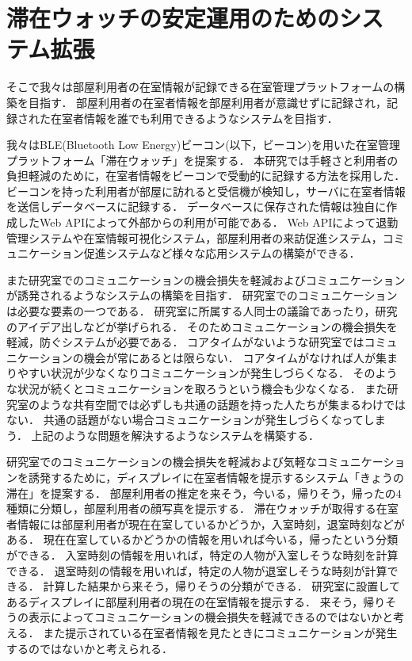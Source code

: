 \section{滞在ウォッチの安定運用のためのシステム拡張}\label{1.2}
そこで我々は部屋利用者の在室情報が記録できる在室管理プラットフォームの構築を目指す．
部屋利用者の在室者情報を部屋利用者が意識せずに記録され，記録された在室者情報を誰でも利用できるようなシステムを目指す．

我々はBLE(Bluetooth Low Energy)ビーコン(以下，ビーコン)\cite{beacon}を用いた在室管理プラットフォーム「滞在ウォッチ」を提案する．
本研究では手軽さと利用者の負担軽減のために，在室者情報をビーコンで受動的に記録する方法を採用した．%
ビーコンを持った利用者が部屋に訪れると受信機が検知し，サーバに在室者情報を送信しデータベースに記録する．
データベースに保存された情報は独自に作成したWeb APIによって外部からの利用が可能である．
Web APIによって退勤管理システムや在室情報可視化システム，部屋利用者の来訪促進システム，コミュニケーション促進システムなど様々な応用システムの構築ができる．

また研究室でのコミュニケーションの機会損失を軽減およびコミュニケーションが誘発されるようなシステムの構築を目指す．
研究室でのコミュニケーションは必要な要素の一つである．
研究室に所属する人同士の議論であったり，研究のアイデア出しなどが挙げられる．
そのためコミュニケーションの機会損失を軽減，防ぐシステムが必要である．
コアタイムがないような研究室ではコミュニケーションの機会が常にあるとは限らない．
コアタイムがなければ人が集まりやすい状況が少なくなりコミュニケーションが発生しづらくなる．
そのような状況が続くとコミュニケーションを取ろうという機会も少なくなる．
また研究室のような共有空間では必ずしも共通の話題を持った人たちが集まるわけではない．
共通の話題がない場合コミュニケーションが発生しづらくなってしまう．
上記のような問題を解決するようなシステムを構築する．

研究室でのコミュニケーションの機会損失を軽減および気軽なコミュニケーションを誘発するために，ディスプレイに在室者情報を提示するシステム「きょうの滞在」を提案する．
部屋利用者の推定を来そう，今いる，帰りそう，帰ったの4種類に分類し，部屋利用者の顔写真を提示する．
滞在ウォッチが取得する在室者情報には部屋利用者が現在在室しているかどうか，入室時刻，退室時刻などがある．
現在在室しているかどうかの情報を用いれば今いる，帰ったという分類ができる．
入室時刻の情報を用いれば，特定の人物が入室しそうな時刻を計算できる．
退室時刻の情報を用いれば，特定の人物が退室しそうな時刻が計算できる．
計算した結果から来そう，帰りそうの分類ができる．
研究室に設置してあるディスプレイに部屋利用者の現在の在室情報を提示する．
来そう，帰りそうの表示によってコミュニケーションの機会損失を軽減できるのではないかと考える．
また提示されている在室者情報を見たときにコミュニケーションが発生するのではないかと考えられる．